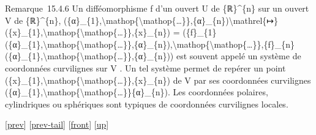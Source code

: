 \documentclass[]{article}
\begin{document}
Remarque~15.4.6 Un difféomorphisme f d'un ouvert U de \{ℝ\}\^{}\{n\} sur
un ouvert V de \{ℝ\}\^{}\{n\},
(\{α\}\_\{1\},\textbackslash{}mathop\{\textbackslash{}mathop\{\ldots{}\}\},\{α\}\_\{n\})\textbackslash{}mathrel\{↦\}(\{x\}\_\{1\},\textbackslash{}mathop\{\textbackslash{}mathop\{\ldots{}\}\},\{x\}\_\{n\})
=
(\{f\}\_\{1\}(\{α\}\_\{1\},\textbackslash{}mathop\{\textbackslash{}mathop\{\ldots{}\}\},\{α\}\_\{n\}),\textbackslash{}mathop\{\textbackslash{}mathop\{\ldots{}\}\},\{f\}\_\{n\}(\{α\}\_\{1\},\textbackslash{}mathop\{\textbackslash{}mathop\{\ldots{}\}\},\{α\}\_\{n\}))
est souvent appelé un système de coordonnées curvilignes sur V . Un tel
système permet de repérer un point
(\{x\}\_\{1\},\textbackslash{}mathop\{\textbackslash{}mathop\{\ldots{}\}\},\{x\}\_\{n\})
de V par ses coordonnées curvilignes
(\{α\}\_\{1\},\textbackslash{}mathop\{\textbackslash{}mathop\{\ldots{}\}\}\{α\}\_\{n\}).
Les coordonnées polaires, cylindriques ou sphériques sont typiques de
coordonnées curvilignes locales.

{[}\href{coursse84.html}{prev}{]}
{[}\href{coursse84.html\#tailcoursse84.html}{prev-tail}{]}
{[}\href{coursse85.html}{front}{]}
{[}\href{coursch16.html\#coursse85.html}{up}{]}
\end{document}
